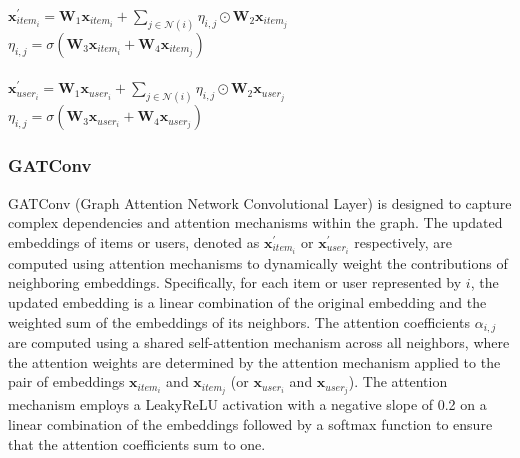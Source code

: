 \documentclass{scrartcl}
\begin{document}
\begin{center}
    $\mathbf{x}^{\prime}_{item_{i}} = \mathbf{W}_1 \mathbf{x}_{item_{i}} + \sum_{j \in \mathcal{N}(i)} \eta_{i,j} \odot \mathbf{W}_2 \mathbf{x}_{item_{j}}$\\ 
    $\eta_{i,j} = \sigma(\mathbf{W}_3 \mathbf{x}_{item_{i}} + \mathbf{W}_4
    \mathbf{x}_{item_{j}})$ \\~\\
    $\mathbf{x}^{\prime}_{user_{i}} = \mathbf{W}_1 \mathbf{x}_{user_{i}} + \sum_{j \in \mathcal{N}(i)} \eta_{i,j} \odot \mathbf{W}_2 \mathbf{x}_{user_{j}}$\\ 
    $\eta_{i,j} = \sigma(\mathbf{W}_3 \mathbf{x}_{user_{i}} + \mathbf{W}_4
    \mathbf{x}_{user_{j}})$
\end{center}


\subsubsection{GATConv\cite{gatconv}} 

\quad GATConv (Graph Attention Network Convolutional Layer) is designed to capture complex dependencies and attention mechanisms within the graph. The updated embeddings of items or users, denoted as $\mathbf{x}^{\prime}_{item_i}$ or $\mathbf{x}^{\prime}_{user_i}$ respectively, are computed using attention mechanisms to dynamically weight the contributions of neighboring embeddings. Specifically, for each item or user represented by $i$, the updated embedding is a linear combination of the original embedding and the weighted sum of the embeddings of its neighbors. The attention coefficients $\alpha_{i,j}$ are computed using a shared self-attention mechanism across all neighbors, where the attention weights are determined by the attention mechanism applied to the pair of embeddings $\mathbf{x}_{item_i}$ and $\mathbf{x}_{item_j}$ (or $\mathbf{x}_{user_i}$ and $\mathbf{x}_{user_j}$). The attention mechanism employs a LeakyReLU activation with a negative slope of 0.2 on a linear combination of the embeddings followed by a softmax function to ensure that the attention coefficients sum to one.\\ 
\end{document}
